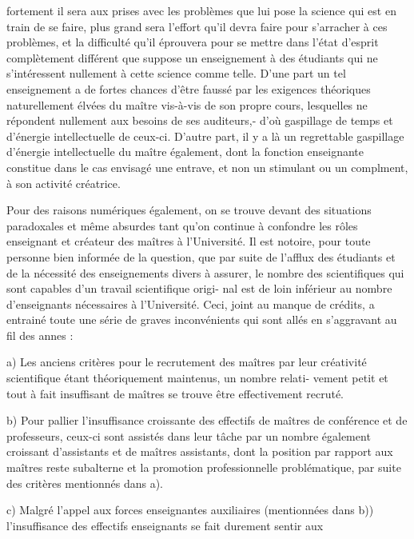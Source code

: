 
fortement il sera aux prises avec les problèmes que lui pose la science qui
est en train de se faire, plus grand sera l'effort qu'il devra faire pour
s'arracher à ces problèmes, et la difficulté qu'il éprouvera pour se mettre
dans l'état d'esprit complètement différent que suppose un enseignement à
des étudiants qui ne s'intéressent nullement à cette science comme telle.
D'une part un tel enseignement a de fortes chances d'être faussé par les
exigences théoriques naturellement élvées du maître vis-à-vis de son propre
cours, lesquelles ne répondent nullement aux besoins de ses auditeurs,- d'où
gaspillage de temps et d'énergie intellectuelle de ceux-ci. D'autre part, il
y a là un regrettable gaspillage d'énergie intellectuelle du maître également,
dont la fonction enseignante constitue dans le cas envisagé une entrave, et
non un stimulant ou un complment, à son activité créatrice.

Pour des raisons numériques également, on se trouve devant des
situations paradoxales et même absurdes tant qu'on continue à confondre
les rôles enseignant et créateur des maîtres à l'Université. Il est notoire,
pour toute personne bien informée de la question, que par suite de l'afflux
des étudiants et de la nécessité des enseignements divers à assurer, le
nombre des scientifiques qui sont capables d'un travail scientifique origi-%
nal est de loin inférieur au nombre d'enseignants nécessaires à l'Université.
Ceci, joint au manque de crédits, a entrainé toute une série de graves
inconvénients qui sont allés en s'aggravant au fil des annes :

a) Les anciens critères pour le recrutement des maîtres par leur
créativité scientifique étant théoriquement maintenus, un nombre relati-%
vement petit et tout à fait insuffisant de maîtres se trouve être effectivement
recruté.

b) Pour pallier  l'insuffisance croissante des effectifs de
maîtres de conférence et de professeurs, ceux-ci sont assistés dans leur
tâche par un nombre également croissant d'assistants et de maîtres assistants,
dont la position par rapport aux maîtres reste subalterne et la promotion
professionnelle problématique, par suite des critères mentionnés dans a).

c) Malgré l'appel aux forces enseignantes auxiliaires (mentionnées
dans b)) l'insuffisance des effectifs enseignants se fait durement sentir aux

